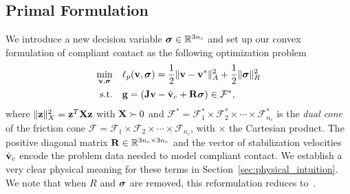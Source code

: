 
\subsection{Primal Formulation}
\label{sec:primal_formulation}

We introduce a new decision variable ${\bm{\sigma}}\in\mathbb{R}^{3n_c}$ and set
up our convex formulation of compliant contact as the following 
optimization problem
\begin{equation}
	\begin{aligned}
	\min_{\mf{v},\bsigma} \quad & \ell_p(\mf{v},\bsigma) =
	\frac{1}{2}\Vert\mf{v}-\mf{v}^*\Vert_{A}^2 +
	\frac{1}{2} \Vert\bsigma\Vert_{R}^2\\
	\textrm{s.t.} \quad & \mf{g} = (\mf{J}\mf{v}-\hat{\mf{v}}_c + \mf{R}\bsigma) \in \mathcal{F}^*,\\
	\end{aligned}
	\label{eq:primal_regularized}
\end{equation}
where $\Vert{\mathbf{z}}\Vert_X^2={\mathbf{z}}^T{\mathbf{X}}{\mathbf{z}}$ with ${\mathbf{X}}\succ 0$ and
$\mathcal{F^*}= \mathcal{F}^*_1 \times \mathcal{F}^*_2 \times \cdots \times
\mathcal{F}^*_{n_c}$ is the \emph{dual cone} of the friction cone $\mathcal{F} =
\mathcal{F}_1 \times \mathcal{F}_2 \times \cdots \times \mathcal{F}_{n_c}$, with
$\times$ the Cartesian product. The positive diagonal matrix
${\mathbf{R}}\in\mathbb{R}^{3n_c\times 3n_c}$ and the vector of stabilization
velocities $\hat{{\mathbf{v}}}_c$ encode the problem data needed to model compliant
contact. We establish a very clear physical meaning for these terms in
Section~\ref{sec:physical_intuition}.  We note that when $R$ and ${\bm\sigma}$
are removed, this reformulation reduces to~\cite{bib:mazhar2014}.

